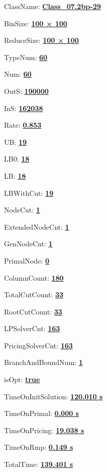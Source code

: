 \documentclass[11pt]{article}
\begin{document}
\pagestyle{empty}


ClassName: \underline{\textbf{Class_07.2bp-29}}
\par
BinSize: \underline{\textbf{100 × 100}}
\par
ReduceSize: \underline{\textbf{100 × 100}}
\par
TypeNum: \underline{\textbf{60}}
\par
Num: \underline{\textbf{60}}
\par
OutS: \underline{\textbf{190000}}
\par
InS: \underline{\textbf{162038}}
\par
Rate: \underline{\textbf{0.853}}
\par
UB: \underline{\textbf{19}}
\par
LB0: \underline{\textbf{18}}
\par
LB: \underline{\textbf{18}}
\par
LBWithCut: \underline{\textbf{19}}
\par
NodeCut: \underline{\textbf{1}}
\par
ExtendedNodeCnt: \underline{\textbf{1}}
\par
GenNodeCnt: \underline{\textbf{1}}
\par
PrimalNode: \underline{\textbf{0}}
\par
ColumnCount: \underline{\textbf{180}}
\par
TotalCutCount: \underline{\textbf{33}}
\par
RootCutCount: \underline{\textbf{33}}
\par
LPSolverCnt: \underline{\textbf{163}}
\par
PricingSolverCnt: \underline{\textbf{163}}
\par
BranchAndBoundNum: \underline{\textbf{1}}
\par
isOpt: \underline{\textbf{true}}
\par
TimeOnInitSolution: \underline{\textbf{120.010 s}}
\par
TimeOnPrimal: \underline{\textbf{0.000 s}}
\par
TimeOnPricing: \underline{\textbf{19.038 s}}
\par
TimeOnRmp: \underline{\textbf{0.149 s}}
\par
TotalTime: \underline{\textbf{139.401 s}}
\par
\newpage


\end{document}

